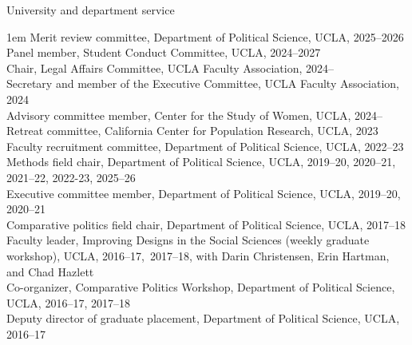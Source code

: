 \documentclass[10.9pt]{article}
\makeatletter
\newcommand\donotbreakhere{\par\nobreak\@afterheading\vspace{1em}}
\newcommand{\complete}{1}
\newenvironment{indnt}{\begin{adjustwidth}{1em}{}}{\end{adjustwidth}}
\makeatother
\begin{document}
{\large University and department service} \donotbreakhere
\begin{indnt}
Merit review committee, Department of Political Science, UCLA, 2025--2026\\[.75em]
Panel member, Student Conduct Committee, UCLA, 2024--2027\\[0.75em]
Chair, Legal Affairs Committee, UCLA Faculty Association, 2024--\\[0.75em]
Secretary and member of the Executive Committee, UCLA Faculty Association, 2024\\[0.75em]
Advisory committee member, Center for the Study of Women, UCLA, 2024--\\[0.75em]
Retreat committee, California Center for Population Research, UCLA, 2023\\[0.75em]
Faculty recruitment committee, Department of Political Science, UCLA, 2022--23\\[0.75em]
Methods field chair, Department of Political Science, UCLA, 2019--20, 2020--21, 2021--22, 2022-23, 2025--26 \\[.75em]
Executive committee member, Department of Political Science, UCLA, 2019--20, 2020--21 \\[.75em]
Comparative politics field chair, Department of Political Science, UCLA, 2017--18 \\[.75em]
Faculty leader, Improving Designs in the Social Sciences (weekly graduate workshop), UCLA, \mbox{2016--17, 2017--18}, with Darin Christensen, Erin Hartman, and Chad Hazlett\\[.75em]
Co-organizer, Comparative Politics Workshop, Department of Political Science, UCLA, 2016--17, 2017--18\\[.75em]
Deputy director of graduate placement, Department of Political Science, UCLA, 2016--17
\end{indnt}
\vspace{1.5em}
\end{document}

